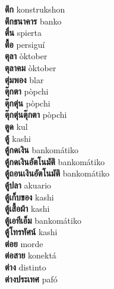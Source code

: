 \textbf{ ตึก  } konstrukshon \\
\textbf{ ตึกธนาคาร  } banko \\
\textbf{ ตื่น  } spierta \\
\textbf{ ตื้อ  } persiguí \\
\textbf{ ตุลา  } òktober \\
\textbf{ ตุลาคม  } òktober \\
\textbf{ ตุ่มพอง  } blar \\
\textbf{ ตุ๊กตา  } pòpchi \\
\textbf{ ตุ๊กตุ่น  } pòpchi \\
\textbf{ ตุ๊กตุ่นตุ๊กตา  } pòpchi \\
\textbf{ ตูด  } kul \\
\textbf{ ตู้  } kashi \\
\textbf{ ตู้กดเงิน  } bankomátiko \\
\textbf{ ตู้กดเงินอัตโนมัติ  } bankomátiko \\
\textbf{ ตู้ถอนเงินอัตโนมัติ  } bankomátiko \\
\textbf{ ตู้ปลา  } akuario \\
\textbf{ ตู้เก็บของ  } kashi \\
\textbf{ ตู้เสื้อผ้า  } kashi \\
\textbf{ ตู้เอทีเอ็ม  } bankomátiko \\
\textbf{ ตู้โทรทัศน์  } kashi \\
\textbf{ ต่อย  } morde \\
\textbf{ ต่อสาย  } konektá \\
\textbf{ ต่าง  } distinto \\
\textbf{ ต่างประเทศ  } pafó \\
